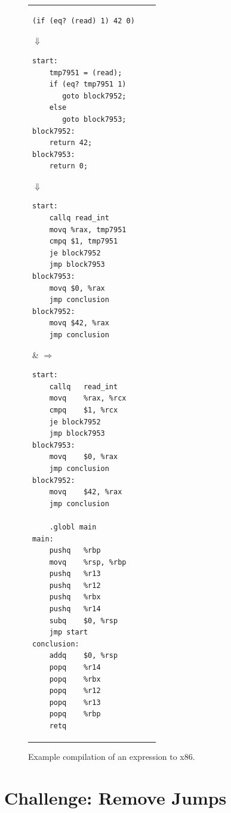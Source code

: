 \documentclass[11pt]{book}
\begin{document}
\begin{figure}[tbp]
\begin{tabular}{lll}
\begin{minipage}{0.4\textwidth}
\begin{lstlisting}
(if (eq? (read) 1) 42 0)
\end{lstlisting}
$\Downarrow$
\begin{lstlisting}
start:
    tmp7951 = (read);
    if (eq? tmp7951 1)
       goto block7952;
    else
       goto block7953;
block7952:
    return 42;
block7953:
    return 0;
\end{lstlisting}
$\Downarrow$
\begin{lstlisting}
start:
    callq read_int
    movq %rax, tmp7951
    cmpq $1, tmp7951
    je block7952
    jmp block7953
block7953:
    movq $0, %rax
    jmp conclusion
block7952:
    movq $42, %rax
    jmp conclusion
\end{lstlisting}
\end{minipage}
&
$\Rightarrow\qquad$
\begin{minipage}{0.4\textwidth}
\begin{lstlisting}
start:
	callq	read_int
	movq	%rax, %rcx
	cmpq	$1, %rcx
	je block7952
	jmp block7953
block7953:
	movq	$0, %rax
	jmp conclusion
block7952:
	movq	$42, %rax
	jmp conclusion

	.globl main
main:
	pushq	%rbp
	movq	%rsp, %rbp
	pushq	%r13
	pushq	%r12
	pushq	%rbx
	pushq	%r14
	subq	$0, %rsp
	jmp start
conclusion:
	addq	$0, %rsp
	popq	%r14
	popq	%rbx
	popq	%r12
	popq	%r13
	popq	%rbp
	retq
\end{lstlisting}
\end{minipage}
\end{tabular}
\caption{Example compilation of an  expression to x86.}
\label{fig:if-example-x86}
\end{figure}


\section{Challenge: Remove Jumps}
\label{sec:opt-jumps}

\end{document}
